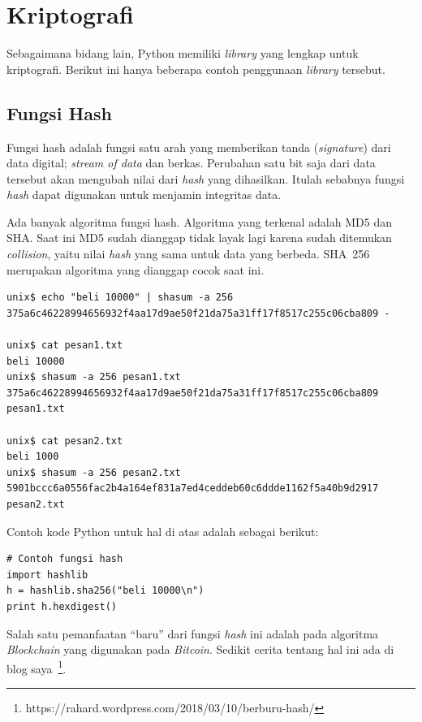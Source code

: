 

\section{Kriptografi}
Sebagaimana bidang lain, Python memiliki {\em library} yang lengkap untuk
kriptografi. Berikut ini hanya beberapa contoh penggunaan {\em library}
tersebut.

\subsection{Fungsi Hash}
Fungsi hash adalah fungsi satu arah yang memberikan tanda ({\em signature})
dari data digital; {\em stream of data} dan berkas.
Perubahan satu bit saja dari data tersebut akan mengubah nilai dari
{\em hash} yang dihasilkan. Itulah sebabnya fungsi {\em hash} dapat
digunakan untuk menjamin integritas data.

Ada banyak algoritma fungsi hash. Algoritma yang terkenal adalah MD5
dan SHA. Saat ini MD5 sudah dianggap tidak layak lagi karena sudah
ditemukan {\em collision}, yaitu nilai {\em hash} yang sama untuk data
yang berbeda. SHA~256 merupakan algoritma yang dianggap cocok saat ini.

\begin{verbatim}
unix$ echo "beli 10000" | shasum -a 256
375a6c46228994656932f4aa17d9ae50f21da75a31ff17f8517c255c06cba809 -

unix$ cat pesan1.txt
beli 10000
unix$ shasum -a 256 pesan1.txt
375a6c46228994656932f4aa17d9ae50f21da75a31ff17f8517c255c06cba809 pesan1.txt

unix$ cat pesan2.txt
beli 1000
unix$ shasum -a 256 pesan2.txt
5901bccc6a0556fac2b4a164ef831a7ed4ceddeb60c6ddde1162f5a40b9d2917 pesan2.txt
\end{verbatim}

Contoh kode Python untuk hal di atas adalah sebagai berikut:

\begin{verbatim}
# Contoh fungsi hash
import hashlib
h = hashlib.sha256("beli 10000\n")
print h.hexdigest()
\end{verbatim}


Salah satu pemanfaatan ``baru'' dari fungsi {\em hash} ini adalah pada
algoritma {\em Blockchain} yang digunakan pada {\em Bitcoin}. Sedikit
cerita tentang hal ini ada di blog
saya~\footnote{https://rahard.wordpress.com/2018/03/10/berburu-hash/}.
